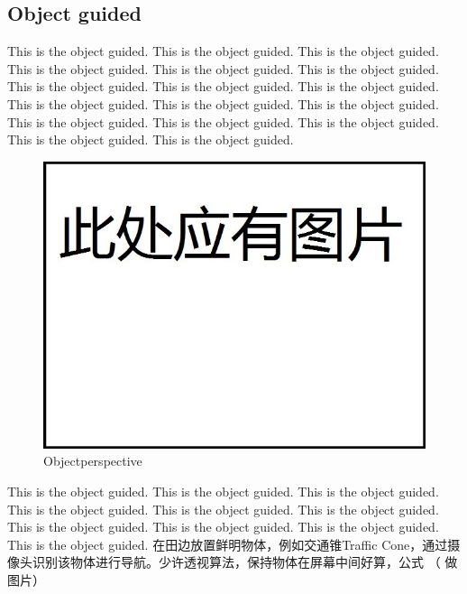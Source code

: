 \documentclass[12pt]{article}
\begin{document}
\begin{flushleft}
\subsection{Object guided}
This is the object guided. This is the object guided. This is the object guided. This is the object guided. This is the object guided. This is the object guided. This is the object guided. This is the object guided. This is the object guided. This is the object guided. This is the object guided. This is the object guided. This is the object guided. This is the object guided. This is the object guided. This is the object guided. This is the object guided. 
\begin{figure}[h!]
	\begin{center}
		\includegraphics[scale = 0.6]{objectperspective.jpg}
		\caption{Objectperspective}
	\end{center}
\end{figure}
This is the object guided. This is the object guided. This is the object guided. This is the object guided. This is the object guided. This is the object guided. This is the object guided. This is the object guided. This is the object guided. This is the object guided. 
在田边放置鲜明物体，例如交通锥Traffic Cone，通过摄像头识别该物体进行导航。少许透视算法，保持物体在屏幕中间好算，公式 （ 做图片）


\end{flushleft}
\end{document}
